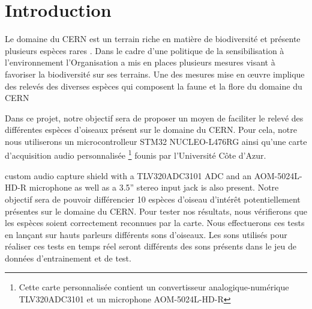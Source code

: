 \chapter{Introduction}

Le domaine du CERN est un terrain riche en matière de biodiversité et présente plusieurs espèces rares \cite{CernBiodiversity1}.
Dans le cadre d'une politique de la sensibilisation à l'environnement l'Organisation a mis en places plusieurs mesures
visant à favoriser la biodiversité sur ses terrains. 
Une des mesures mise en \oe{}uvre implique des relevés des diverses espèces 
qui composent la faune et la flore du domaine du CERN \cite{CernBiodiversity2}

Dans ce projet, notre objectif sera de proposer un moyen de faciliter le relevé des différentes espèces d'oiseaux
présent sur le domaine du CERN.
Pour cela, notre nous utiliserons un microcontrolleur STM32 NUCLEO-L476RG ainsi qu'une carte d'acquisition audio personnalisée 
\footnote{Cette carte personnalisée contient un convertisseur analogique-numérique TLV320ADC3101 et un microphone AOM-5024L-HD-R}
founis par l'Université Côte d'Azur. 

 custom audio capture shield with a TLV320ADC3101 ADC and an AOM-5024L-HD-R microphone as well as a 3.5” stereo input jack is also present.
Notre objectif sera de pouvoir différencier 10 espèces d'oiseau d'intérêt potentiellement présentes sur le domaine du CERN.
Pour tester nos résultats, nous vérifierons que les espèces soient correctement reconnues par la carte. Nous effectuerons ces tests
en lançant sur hauts parleurs différents sons d'oiseaux. 
Les sons utilisés pour réaliser ces tests en temps réel seront différents des sons présents dans le jeu de données d'entrainement et de test.
